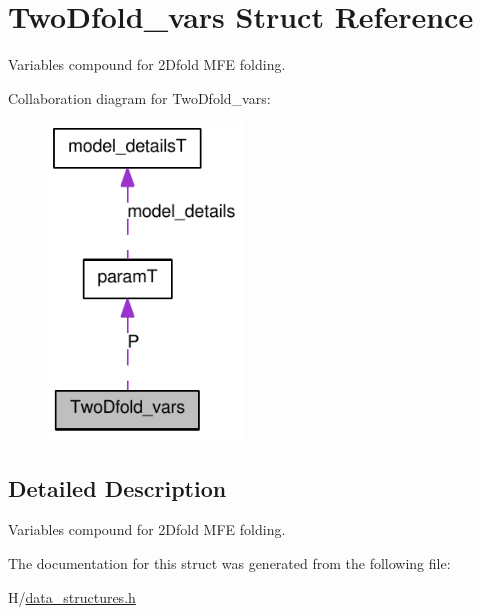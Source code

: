\hypertarget{structTwoDfold__vars}{
\section{TwoDfold\_\-vars Struct Reference}
\label{structTwoDfold__vars}
}


Variables compound for 2Dfold MFE folding.  




Collaboration diagram for TwoDfold\_\-vars:\nopagebreak
\begin{figure}[H]
\begin{center}
\leavevmode
\includegraphics[width=146pt]{structTwoDfold__vars__coll__graph}
\end{center}
\end{figure}


\subsection{Detailed Description}
Variables compound for 2Dfold MFE folding. 

The documentation for this struct was generated from the following file:\begin{DoxyCompactItemize}
\item 
H/\hyperlink{data__structures_8h}{data\_\-structures.h}\end{DoxyCompactItemize}
